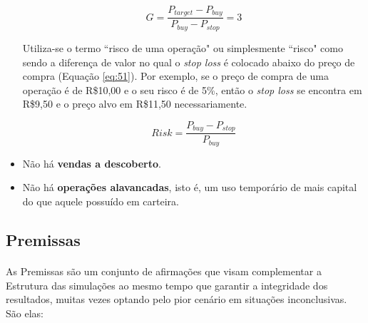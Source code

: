 \begin{itemize}
    \begin{equation} \label{eq:50}
        G = \dfrac{P_{target} - P_{buy}}{P_{buy} - P_{stop}} = 3
    \end{equation}

    Utiliza-se o termo ``risco de uma operação" ou simplesmente ``risco" como sendo a diferença de valor no qual o \textit{stop loss} é colocado abaixo do preço de compra (Equação \ref{eq:51}). Por exemplo, se o preço de compra de uma operação é de R\$10,00 e o seu risco é de 5\%, então o \textit{stop loss} se encontra em R\$9,50 e o preço alvo em R\$11,50 necessariamente.

    \begin{equation} \label{eq:51}
        Risk = \dfrac{P_{buy} - P_{stop}}{P_{buy}}
    \end{equation}

    \item Não há \textbf{vendas a descoberto}.
    \item Não há \textbf{operações alavancadas}, isto é, um uso temporário de mais capital do que aquele possuído em carteira.

\end{itemize}



\FloatBarrier
\subsection{Premissas}

\paragraph{} As Premissas são um conjunto de afirmações que visam complementar a Estrutura das simulações ao mesmo tempo que garantir a integridade dos resultados, muitas vezes optando pelo pior cenário em situações inconclusivas. São elas:


